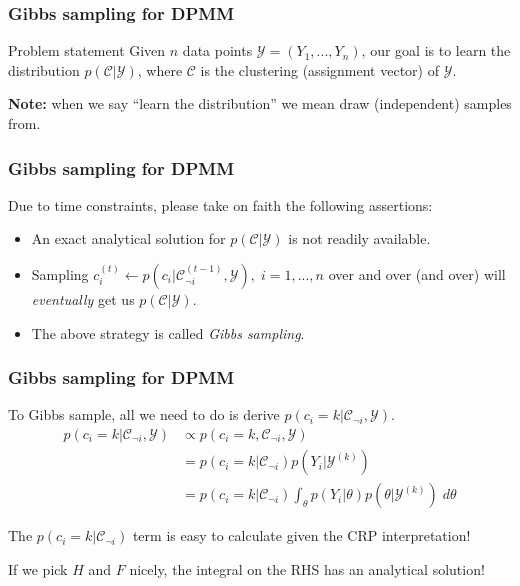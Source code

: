 \documentclass{beamer}
\newcommand{\Y}{\ensuremath{\mathcal{Y}}}
\newcommand{\C}{\ensuremath{\mathcal{C}}}
\begin{document}
\begin{frame}
\frametitle{Gibbs sampling for DPMM}
\pause
\begin{block}{Problem statement}
Given $n$ data points $\Y = (Y_1, ..., Y_n)$, our goal is to learn the
distribution $p(\C | \Y)$, where $\C$ is the clustering (assignment vector) of $\Y$.
\end{block}
\pause
\textbf{Note:} when we say ``learn the distribution'' we mean draw
(independent) samples from.
\end{frame}


\begin{frame}
\frametitle{Gibbs sampling for DPMM}
Due to time constraints, please take on faith the following assertions:
\pause
\begin{itemize}[<+->]
  \item An exact analytical solution for $p(\C | \Y)$ is not readily available.
  \item Sampling $c_i^{(t)} \gets p(c_i | \C^{(t-1)}_{\neg i}, \Y), \;
    i=1,...,n$ over and over (and over) will \emph{eventually} get us $p(\C | \Y)$.
  \item The above strategy is called \emph{Gibbs sampling}.
\end{itemize}
\end{frame}


\begin{frame}
\frametitle{Gibbs sampling for DPMM}
To Gibbs sample, all we need to do is derive $p(c_i{=}k | \C_{\neg i}, \Y)$. 
\pause
\begin{align*}
  p(c_i{=}k | \C_{\neg i}, \Y) &\propto p(c_i{=}k, \C_{\neg i}, \Y) \\
                               &= p(c_i{=}k | \C_{\neg i}) p(Y_i | \Y^{(k)}) \\
                               &= p(c_i{=}k | \C_{\neg i}) \int_{\theta} p(Y_i | \theta) p(\theta | \Y^{(k)}) \; d\theta
\end{align*}
\pause

The $p(c_i{=}k|\C_{\neg i})$ term is easy to calculate given the CRP interpretation! \newline
\pause

If we pick $H$ and $F$ nicely, the integral on the RHS has an analytical solution!
\end{frame}
\end{document}
